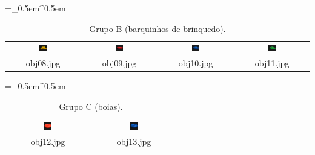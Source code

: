 \begin{table}[H]
  \centering
  \caption{Grupo B (barquinhos de brinquedo).}
  \tabulinesep =_0.5em^0.5em
  \everyrow{\tabucline[0.4pt]-}
  \begin{tabu}{|cccc|}
    \includegraphics[width=0.1\textwidth,height=0.1\textwidth]{imagens/coil_100/barquinhos_brinquedos/obj3__0.png} &
    \includegraphics[width=0.1\textwidth,height=0.1\textwidth]{imagens/coil_100/barquinhos_brinquedos/obj38__0.png} &
    \includegraphics[width=0.1\textwidth,height=0.1\textwidth]{imagens/coil_100/barquinhos_brinquedos/obj42__0.png} &
    \includegraphics[width=0.1\textwidth,height=0.1\textwidth]{imagens/coil_100/barquinhos_brinquedos/obj78__0.png}
    \\
    \scriptsize{obj08.jpg} & \scriptsize{obj09.jpg} & \scriptsize{obj10.jpg} &
    \scriptsize{obj11.jpg}
  \end{tabu}
\end{table}

\begin{table}[H]
  \centering
  \caption{Grupo C (boias).}
  \tabulinesep =_0.5em^0.5em
  \everyrow{\tabucline[0.4pt]-}
  \begin{tabu}{|cc|}
    \includegraphics[width=0.1\textwidth,height=0.1\textwidth]{imagens/coil_100/boias/obj47__0.png} &
    \includegraphics[width=0.1\textwidth,height=0.1\textwidth]{imagens/coil_100/boias/obj94__0.png}
    \\
    \scriptsize{obj12.jpg} & \scriptsize{obj13.jpg}
  \end{tabu}
\end{table}

